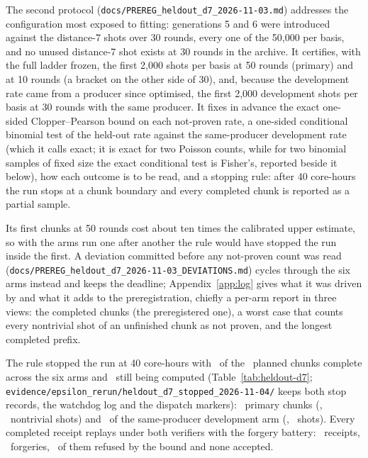 \documentclass[aps,pra,twocolumn,superscriptaddress,nofootinbib,longbibliography,floatfix]{revtex4-2}
\begin{document}
The second protocol (\nolinkurl{docs/PREREG_heldout_d7_2026-11-03.md}) addresses the configuration most exposed to fitting: generations 5 and 6 were introduced against the distance-7 shots over 30 rounds, every one of the 50{,}000 per basis, and no unused distance-7 shot exists at 30 rounds in the archive. It certifies, with the full ladder frozen, the first 2{,}000 shots per basis at 50 rounds (primary) and at 10 rounds (a bracket on the other side of 30), and, because the development rate came from a producer since optimised, the first 2{,}000 development shots per basis at 30 rounds with the same producer. It fixes in advance the exact one-sided Clopper--Pearson bound on each not-proven rate, a one-sided conditional binomial test of the held-out rate against the same-producer development rate (which it calls exact; it is exact for two Poisson counts, while for two binomial samples of fixed size the exact conditional test is Fisher's, reported beside it below), how each outcome is to be read, and a stopping rule: after 40 core-hours the run stops at a chunk boundary and every completed chunk is reported as a partial sample.

Its first chunks at 50 rounds cost about ten times the calibrated upper estimate, so with the arms run one after another the rule would have stopped the run inside the first. A deviation committed before any not-proven count was read (\nolinkurl{docs/PREREG_heldout_d7_2026-11-03_DEVIATIONS.md}) cycles through the six arms instead and keeps the deadline; Appendix~\ref{app:log} gives what it was driven by and what it adds to the preregistration, chiefly a per-arm report in three views: the completed chunks (the preregistered one), a worst case that counts every nontrivial shot of an unfinished chunk as not proven, and the longest completed prefix.

The rule stopped the run at 40 core-hours with \HoDSevenChunks\ of the \HoDSevenChunksPlanned\ planned chunks complete across the six arms and \HoDSevenUnfinishedChunks\ still being computed (Table~\ref{tab:heldout-d7}; \nolinkurl{evidence/epsilon_rerun/heldout_d7_stopped_2026-11-04/} keeps both stop records, the watchdog log and the dispatch markers): \HoDSevenUnfinishedPrimaryChunks\ primary chunks (\HoDSevenUnfinishedPrimaryList, \HoDSevenUnfinishedPrimaryShots\ nontrivial shots) and \HoDSevenUnfinishedOtherChunks\ of the same-producer development arm (\HoDSevenUnfinishedOtherList, \HoDSevenUnfinishedOtherShots\ shots). Every completed receipt replays under both verifiers with the forgery battery: \HoDSevenReplayReceipts\ receipts, \HoDSevenReplayForgeries\ forgeries, \HoDSevenReplayForgeriesBound\ of them refused by the bound and none accepted.
\end{document}
